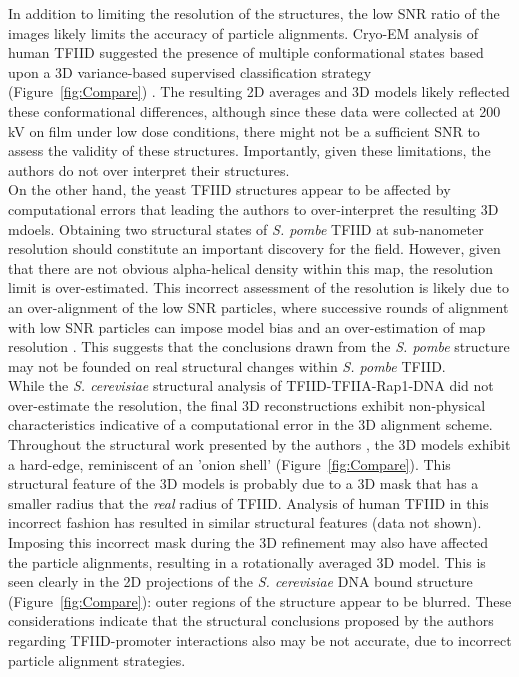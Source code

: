 \indent In addition to limiting the resolution of the structures, the low SNR ratio of the images likely limits the accuracy of particle alignments. Cryo-EM analysis of human TFIID suggested the presence of multiple conformational states based upon a 3D variance-based supervised classification strategy (Figure~\ref{fig:Compare}) \cite{Grob_1281}. The resulting 2D averages and 3D models likely reflected these conformational differences, although since these data were collected at 200 kV on film under low dose conditions, there might not be a sufficient SNR to assess the validity of these structures. Importantly, given these limitations, the authors do not over interpret their structures. \\
\indent On the other hand, the yeast TFIID structures \cite{Elmlund_691,Papai_539} appear to be affected by computational errors that leading the authors to over-interpret the resulting 3D mdoels. Obtaining two structural states of \emph{S. pombe} TFIID at sub-nanometer resolution should constitute an important discovery for the field. However, given that there are not obvious alpha-helical density within this map, the resolution limit is over-estimated. This incorrect assessment of the resolution is likely due to an over-alignment of the low SNR particles, where successive rounds of alignment with low SNR particles can impose model bias and an over-estimation of map resolution \cite{Stewart_2004}. This suggests that the conclusions drawn from the \emph{S. pombe} structure may not be founded on real structural changes within \emph{S. pombe} TFIID. \\
\indent While the \emph{S. cerevisiae} structural analysis of TFIID-TFIIA-Rap1-DNA did not over-estimate the resolution, the final 3D reconstructions exhibit non-physical characteristics indicative of a computational error in the 3D alignment scheme. Throughout the structural work presented by the authors \cite{Papai_539,Papai_418}, the 3D models exhibit a hard-edge, reminiscent of an 'onion shell' (Figure~\ref{fig:Compare}). This structural feature of the 3D models is probably due to a 3D mask that has a smaller radius that the \emph{real} radius of TFIID. Analysis of human TFIID in this incorrect fashion has resulted in similar structural features (data not shown). Imposing this incorrect mask during the 3D refinement may also have affected the particle alignments, resulting in a rotationally averaged 3D model. This is seen clearly in the 2D projections of the \emph{S. cerevisiae} DNA bound structure (Figure~\ref{fig:Compare}): outer regions of the structure appear to be blurred. These considerations indicate that the structural conclusions proposed by the authors regarding TFIID-promoter interactions also may be not accurate, due to incorrect particle alignment strategies.       

